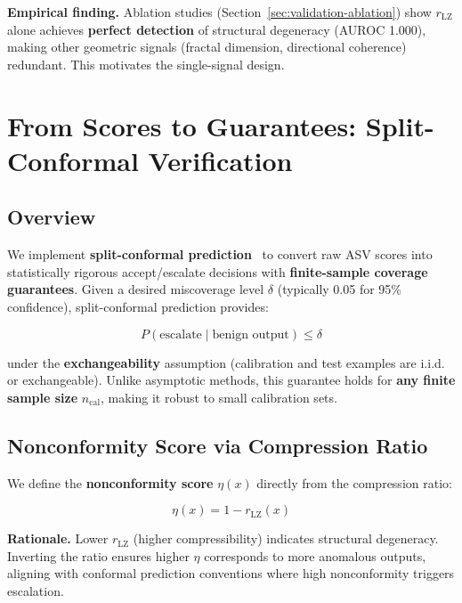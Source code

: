 \documentclass[11pt]{article}
\begin{document}
\textbf{Empirical finding.} Ablation studies (Section~\ref{sec:validation-ablation}) show $r_{\text{LZ}}$ alone achieves \textbf{perfect detection} of structural degeneracy (AUROC 1.000), making other geometric signals (fractal dimension, directional coherence) redundant. This motivates the single-signal design.

\section{From Scores to Guarantees: Split-Conformal Verification}
\label{sec:conformal}

\subsection{Overview}
\label{sec:conformal-overview}

We implement \textbf{split-conformal prediction}~\cite{vovk2005algorithmic,lei2018distribution,angelopoulos2023gentle} to convert raw ASV scores into statistically rigorous accept/escalate decisions with \textbf{finite-sample coverage guarantees}. Given a desired miscoverage level $\delta$ (typically 0.05 for 95\% confidence), split-conformal prediction provides:

\begin{equation}
P(\text{escalate} \mid \text{benign output}) \le \delta
\end{equation}

under the \textbf{exchangeability} assumption (calibration and test examples are i.i.d. or exchangeable). Unlike asymptotic methods, this guarantee holds for \textbf{any finite sample size} $n_{\text{cal}}$, making it robust to small calibration sets.

\subsection{Nonconformity Score via Compression Ratio}
\label{sec:conformal-scores}

We define the \textbf{nonconformity score} $\eta(x)$ directly from the compression ratio:

\begin{equation}
\eta(x) = 1 - r_{\text{LZ}}(x)
\end{equation}

\textbf{Rationale.} Lower $r_{\text{LZ}}$ (higher compressibility) indicates structural degeneracy. Inverting the ratio ensures higher $\eta$ corresponds to more anomalous outputs, aligning with conformal prediction conventions where high nonconformity triggers escalation.
\end{document}
